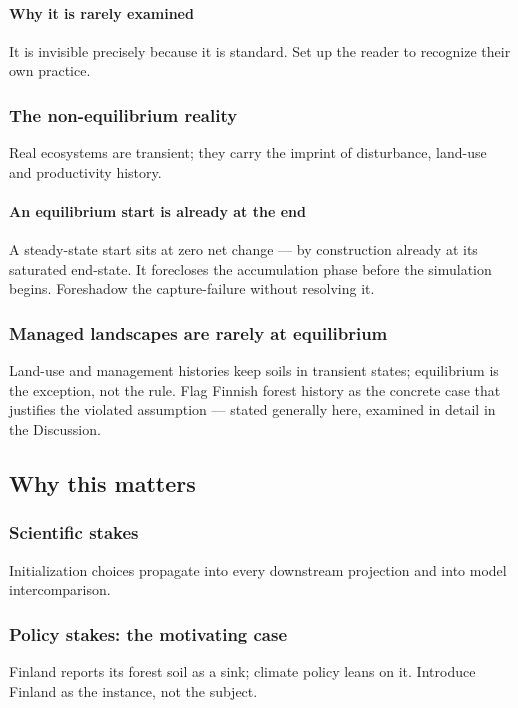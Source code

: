 \documentclass[11pt]{article}
\begin{document}
\paragraph{Why it is rarely examined}
It is invisible precisely because it is standard. Set up the reader to
recognize their own practice.

\subsubsection{The non-equilibrium reality}
Real ecosystems are transient; they carry the imprint of disturbance,
land-use and productivity history.

\paragraph{An equilibrium start is already at the end}
A steady-state start sits at zero net change --- by construction already at
its saturated end-state. It forecloses the accumulation phase before the
simulation begins. Foreshadow the capture-failure without resolving it.

\subsubsection{Managed landscapes are rarely at equilibrium}
Land-use and management histories keep soils in transient states; equilibrium
is the exception, not the rule. Flag Finnish forest history as the concrete
case that justifies the violated assumption --- stated generally here, examined
in detail in the Discussion.

\subsection{Why this matters}

\subsubsection{Scientific stakes}
Initialization choices propagate into every downstream projection and into
model intercomparison.

\subsubsection{Policy stakes: the motivating case}
Finland reports its forest soil as a sink; climate policy leans on it.
Introduce Finland as the instance, not the subject.
\end{document}
